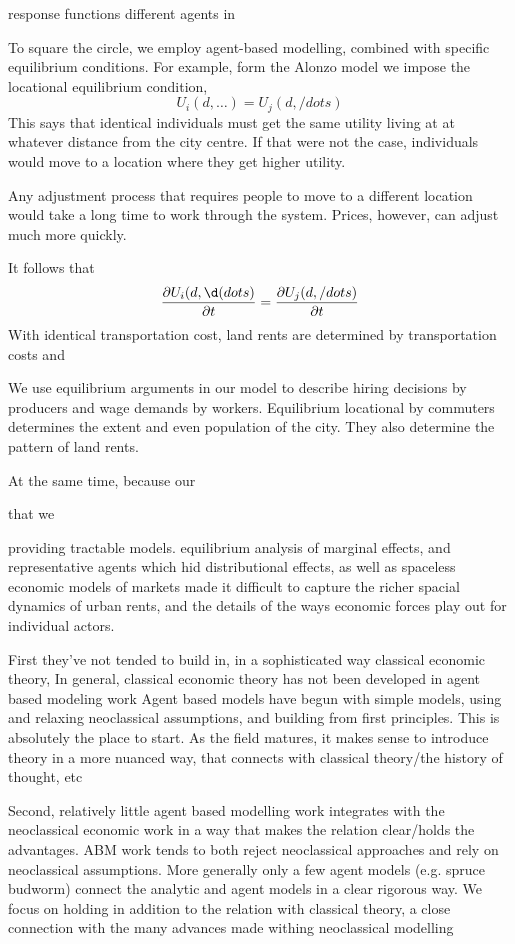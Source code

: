 response functions
different agents in 

To square the circle, we employ  agent-based modelling, combined with specific equilibrium conditions. For example, form the Alonzo model we impose the locational equilibrium condition,
\[U_i(d,\dots)=U_j(d, /dots)\]
This says that identical individuals must get the same utility living at at whatever distance from the city centre. If that were not the case, individuals would move to a location where they get higher utility.

Any adjustment process that requires people to move to a different location would take a long time to work through the system. Prices, however, can adjust much more quickly. 

 It follows that 
\[\frac{\partial U_i(d,\d(dots)}{\partial t}=\frac{\partial U_j(d, /dots)}{\partial t}\]
With identical transportation cost, 
land rents are determined by transportation costs  and  

We use  equilibrium arguments in our model to describe hiring decisions by producers and wage demands by workers. Equilibrium locational by commuters determines the extent and even population of the city. They also determine the pattern of land rents. 

At the same time, because our  

that we 

providing tractable models.  equilibrium analysis of marginal effects, and representative agents which hid distributional effects, as well as spaceless economic models of markets made it difficult to capture the richer spacial dynamics of urban rents, and the details of the ways economic forces play out for individual actors.

First they've not tended to build in, in a sophisticated way classical economic theory,
In general, classical economic theory has not been developed in agent based modeling work
Agent based models have begun with simple models, using and relaxing neoclassical assumptions, and building from first principles. This is absolutely the place to start. As the field matures, it makes sense to introduce theory in a more nuanced way, that connects with classical theory/the history of thought, etc

Second, relatively little agent based modelling work integrates with the neoclassical economic work in a way that makes the relation clear/holds the advantages. ABM work tends to both reject neoclassical approaches and rely on neoclassical assumptions.
More generally only a few agent models (e.g. spruce budworm) connect the analytic and agent models in a clear rigorous way. We focus on holding in addition to the relation with classical theory, a close connection with the many advances made withing neoclassical modelling

